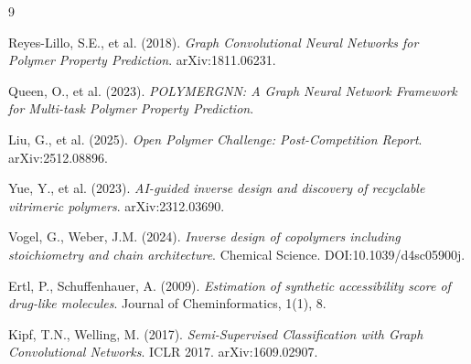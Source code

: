 \documentclass{article}
\begin{document}

\begin{thebibliography}{9}

Reyes-Lillo, S.E., et al. (2018).
\textit{Graph Convolutional Neural Networks for Polymer Property Prediction}.
arXiv:1811.06231.

Queen, O., et al. (2023).
\textit{POLYMERGNN: A Graph Neural Network Framework for Multi-task Polymer Property Prediction}.

Liu, G., et al. (2025).
\textit{Open Polymer Challenge: Post-Competition Report}.
arXiv:2512.08896.

Yue, Y., et al. (2023).
\textit{AI-guided inverse design and discovery of recyclable vitrimeric polymers}.
arXiv:2312.03690.

Vogel, G., Weber, J.M. (2024).
\textit{Inverse design of copolymers including stoichiometry and chain architecture}.
Chemical Science. DOI:10.1039/d4sc05900j.

Ertl, P., Schuffenhauer, A. (2009).
\textit{Estimation of synthetic accessibility score of drug-like molecules}.
Journal of Cheminformatics, 1(1), 8.

Kipf, T.N., Welling, M. (2017).
\textit{Semi-Supervised Classification with Graph Convolutional Networks}.
ICLR 2017. arXiv:1609.02907.

\end{thebibliography}
\end{document}
